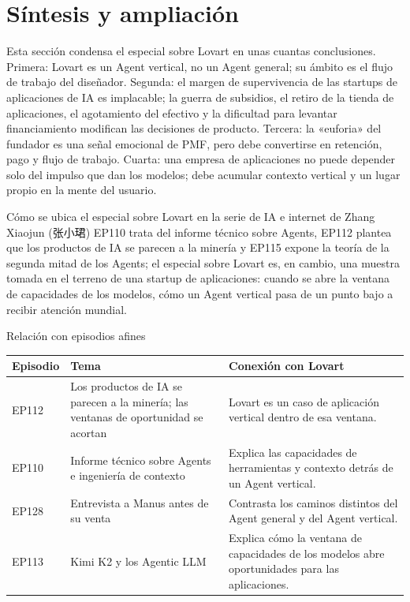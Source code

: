 \section{Síntesis y ampliación}

Esta sección condensa el especial sobre Lovart en unas cuantas conclusiones. Primera: Lovart es un Agent vertical, no un Agent general; su ámbito es el flujo de trabajo del diseñador. Segunda: el margen de supervivencia de las startups de aplicaciones de IA es implacable; la guerra de subsidios, el retiro de la tienda de aplicaciones, el agotamiento del efectivo y la dificultad para levantar financiamiento modifican las decisiones de producto. Tercera: la «euforia» del fundador es una señal emocional de PMF, pero debe convertirse en retención, pago y flujo de trabajo. Cuarta: una empresa de aplicaciones no puede depender solo del impulso que dan los modelos; debe acumular contexto vertical y un lugar propio en la mente del usuario.

\begin{importantbox}{Cómo se ubica el especial sobre Lovart en la serie de IA e internet de Zhang Xiaojun (张小珺)}
EP110 trata del informe técnico sobre Agents, EP112 plantea que los productos de IA se parecen a la minería y EP115 expone la teoría de la segunda mitad de los Agents; el especial sobre Lovart es, en cambio, una muestra tomada en el terreno de una startup de aplicaciones: cuando se abre la ventana de capacidades de los modelos, cómo un Agent vertical pasa de un punto bajo a recibir atención mundial.
\end{importantbox}

\begin{knowledgebox}{Relación con episodios afines}
\begin{tabularx}{\textwidth}{p{}p{}X}
\toprule
Episodio & Tema & Conexión con Lovart \\
\midrule
EP112 & Los productos de IA se parecen a la minería; las ventanas de oportunidad se acortan & Lovart es un caso de aplicación vertical dentro de esa ventana. \\
EP110 & Informe técnico sobre Agents e ingeniería de contexto & Explica las capacidades de herramientas y contexto detrás de un Agent vertical. \\
EP128 & Entrevista a Manus antes de su venta & Contrasta los caminos distintos del Agent general y del Agent vertical. \\
EP113 & Kimi K2 y los Agentic LLM & Explica cómo la ventana de capacidades de los modelos abre oportunidades para las aplicaciones. \\
\bottomrule
\end{tabularx}
\end{knowledgebox}

